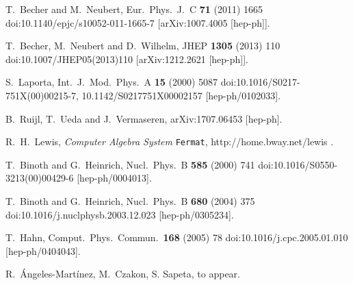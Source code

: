 \documentclass{PoS}
\begin{document}
\begin{thebibliography}{99}
  T.~Becher and M.~Neubert,
  Eur.\ Phys.\ J.\ C {\bf 71} (2011) 1665
  doi:10.1140/epjc/s10052-011-1665-7
  [arXiv:1007.4005 [hep-ph]].

  T.~Becher, M.~Neubert and D.~Wilhelm,
  JHEP {\bf 1305} (2013) 110
  doi:10.1007/JHEP05(2013)110
  [arXiv:1212.2621 [hep-ph]].

  S.~Laporta,
  Int.\ J.\ Mod.\ Phys.\ A {\bf 15} (2000) 5087
  doi:10.1016/S0217-751X(00)00215-7, 10.1142/S0217751X00002157
  [hep-ph/0102033].

  B.~Ruijl, T.~Ueda and J.~Vermaseren,
  arXiv:1707.06453 [hep-ph].

  R.~H.~Lewis,
  {\it Computer Algebra System} {\tt Fermat},
  {http://home.bway.net/lewis} .

  T.~Binoth and G.~Heinrich,
  Nucl.\ Phys.\ B {\bf 585} (2000) 741
  doi:10.1016/S0550-3213(00)00429-6
  [hep-ph/0004013].

  T.~Binoth and G.~Heinrich,
  Nucl.\ Phys.\ B {\bf 680} (2004) 375
  doi:10.1016/j.nuclphysb.2003.12.023
  [hep-ph/0305234].

  T.~Hahn,
  Comput.\ Phys.\ Commun.\  {\bf 168} (2005) 78
  doi:10.1016/j.cpc.2005.01.010
  [hep-ph/0404043].

  R.~\'Angeles-Mart\'inez, M.~Czakon, S. Sapeta,
  to appear.

\end{thebibliography}
\end{document}
